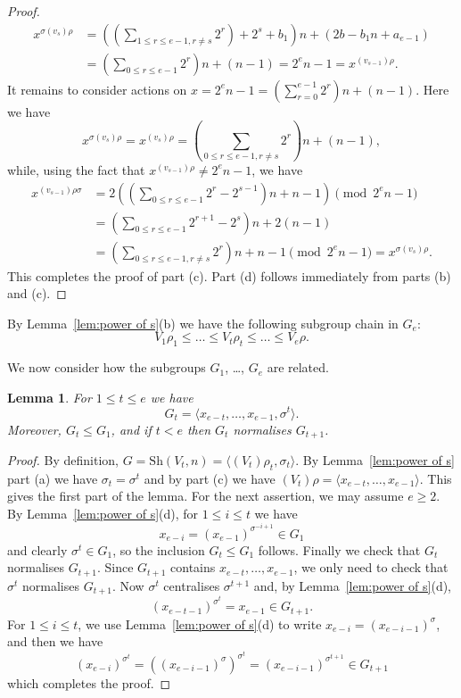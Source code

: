 \documentclass[12pt]{amsart}
\newtheorem{lem}[thm]{Lemma}
\theoremstyle{remark}
\theoremstyle{definition}
\newcommand{\sh}{\mathrm{Sh}}
\begin{document}
\begin{proof}
\begin{align*}
x^{\sigma(v_s)\rho} &=\left((\sum_{1\leqslant r\leqslant e-1, r\ne s}2^{r}) + 2^s + b_1\right) n + (2b-b_1n+a_{e-1})\\
	&=  (\sum_{0\leqslant r\leqslant e-1}2^{r}) n + (n-1) = 2^en-1 = x^{(v_{s-1})\rho}.
\end{align*}
%
It remains to consider actions on $x=2^en-1 = 
(\sum_{r=0}^{e-1}2^r)n+(n-1)$. Here we have
\[
x^{\sigma(v_s)\rho}  = x^{(v_s)\rho} = (\sum_{0\leqslant r\leqslant e-1, r\ne s}2^{r}) n + (n-1),
\]
while, using the fact that $x^{(v_{s-1})\rho}\ne 2^en-1$, we have
\begin{align*}
x^{(v_{s-1})\rho\sigma} &=  2\left(   (\sum_{0\leqslant r\leqslant e-1}2^{r} - 2^{s-1}) n + n-1\right)\pmod{2^en-1} \\
		&=   (\sum_{0\leqslant r\leqslant e-1}2^{r+1}  -2^s) n + 2(n-1)\\
		&= (\sum_{0\leqslant r\leqslant e-1, r\ne s}2^{r}) n + n-1\pmod{2^en-1} = x^{\sigma(v_s)\rho} .
\end{align*}
This completes the proof of part (c). Part (d) follows immediately from parts (b) and (c).
\end{proof}

By Lemma~\ref{lem:power of s}(b)  we have the following subgroup chain in $G_e$: 
	\[ 
	V_1\rho_1  \leqslant \dots \leqslant V_{t}\rho_t  \leqslant \dots \leqslant  V_{e}\rho. \]

We now consider how the subgroups $G_1$, \dots, $G_e$ are related.
	
	
\begin{lem}
\label{lem:containment}
For $1 \leqslant t \leqslant e$ we have
$$G_t = \langle x_{e-t},\dots,x_{e-1}, \sigma^t \rangle.
$$
Moreover, $G_t\leqslant G_1$, and if $t<e$ then $G_t$ normalises $G_{t+1}$. 
\end{lem}
\begin{proof}
By definition, $G=\sh(V_t,n) = \langle (V_t)\rho_t, \sigma_t \rangle$. By Lemma~\ref{lem:power of s} part (a) we have $\sigma_t=\sigma^t$ and by part (c) we have $(V_t)\rho = \langle x_{e-t},\dots,x_{e-1} \rangle$. This gives the first part of the lemma. For the next assertion, we may assume $e \geqslant 2$. 
By Lemma~\ref{lem:power of s}(d), for $1 \leqslant i \leqslant t$ we have
$$x_{e-i} = (x_{e-1})^{\sigma^{-i+1}} \in G_1$$
and clearly $\sigma^t \in G_1$, so the inclusion $G_t\leqslant G_1$ follows. Finally we check that $G_t$ normalises $G_{t+1}$. 
Since $G_{t+1}$ contains $x_{e-t},\dots,x_{e-1}$,  we only need  to check that $ \sigma^t $ normalises $G_{t+1}$. 
%
Now $\sigma^t$ centralises $\sigma^{t+1}$ and, by Lemma~\ref{lem:power of s}(d),  
$$
(x_{e-t-1})^{\sigma^t} =  x_{e-1} \in G_{t+1}.
$$
 For $1 \leqslant i \leqslant t$, we   use Lemma~\ref{lem:power of s}(d) to write $x_{e-i} = (x_{e-i-1})^\sigma$, and then we have
$$
(x_{e-i})^{\sigma^t} = ((x_{e-i-1})^\sigma)^{\sigma^t} = (x_{e-i-1})^{\sigma^{t+1}} \in G_{t+1}
 $$
which completes the proof.
\end{proof}
	
\end{document}
